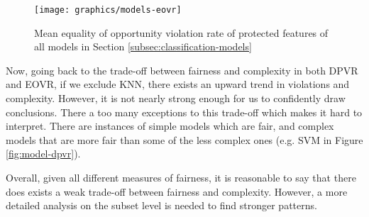 \begin{figure}
	\begin{center}
    	\centering
        \texttt{[image: graphics/models-eovr]}
        \caption{Mean equality of opportunity violation rate of protected features of all models in Section \ref{subsec:classification-models}}
        \label{fig:model-eovr}
     \end{center}
\end{figure}

Now, going back to the trade-off between fairness and complexity in both DPVR and EOVR, if we exclude KNN, there exists an upward trend in violations and complexity. However, it is not nearly strong enough for us to confidently draw conclusions. There a too many exceptions to this trade-off which makes it hard to interpret. There are instances of simple models which are fair, and complex models that are more fair than some of the less complex ones (e.g. SVM in Figure \ref{fig:model-dpvr}).

Overall, given all different measures of fairness, it is reasonable to say that there does exists a weak trade-off between fairness and complexity. However, a more detailed analysis on the subset level is needed to find stronger patterns.